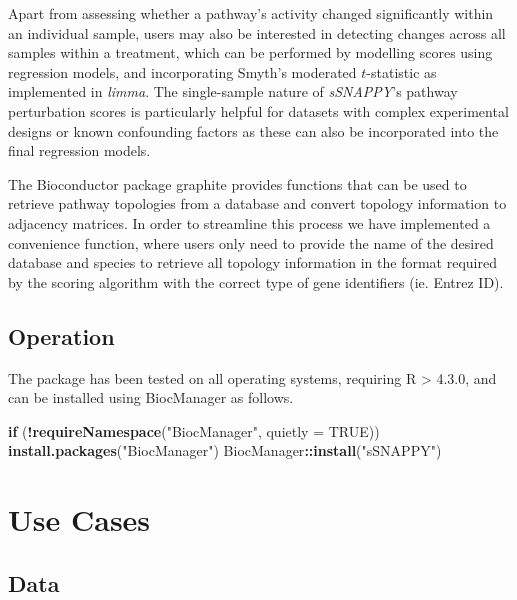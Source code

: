 \documentclass[9pt,a4paper,]{extarticle}
\newenvironment{Shaded}{\begin{snugshade}}{\end{snugshade}}
\newcommand{\AttributeTok}[1]{\textcolor[rgb]{0.13,0.29,0.53}{#1}}
\newcommand{\ConstantTok}[1]{\textcolor[rgb]{0.56,0.35,0.01}{#1}}
\newcommand{\ControlFlowTok}[1]{\textcolor[rgb]{0.13,0.29,0.53}{\textbf{#1}}}
\newcommand{\FunctionTok}[1]{\textcolor[rgb]{0.13,0.29,0.53}{\textbf{#1}}}
\newcommand{\NormalTok}[1]{#1}
\newcommand{\SpecialCharTok}[1]{\textcolor[rgb]{0.81,0.36,0.00}{\textbf{#1}}}
\newcommand{\StringTok}[1]{\textcolor[rgb]{0.31,0.60,0.02}{#1}}
\begin{document}
Apart from assessing whether a pathway's activity changed significantly within an individual sample, users may also be interested in detecting changes across all samples within a treatment, which can be performed by modelling scores using regression models, and incorporating Smyth's moderated \(t\)-statistic\citep{Smyth_2004} as implemented in \emph{limma}\citep{limma_2015}.
The single-sample nature of \emph{sSNAPPY}'s pathway perturbation scores is particularly helpful for datasets with complex experimental designs or known confounding factors as these can also be incorporated into the final regression models.

The Bioconductor package graphite\citep{Sales2012} provides functions that can be used to retrieve pathway topologies from a database and convert topology information to adjacency matrices.
In order to streamline this process we have implemented a convenience function, where users only need to provide the name of the desired database and species to retrieve all topology information in the format required by the scoring algorithm with the correct type of gene identifiers (ie. Entrez ID).

\hypertarget{operation}{%
\subsection{Operation}\label{operation}}

The package has been tested on all operating systems, requiring R \textgreater{} 4.3.0, and can be installed using BiocManager as follows.

\begin{Shaded}
\begin{Highlighting}[]
\ControlFlowTok{if}\NormalTok{ (}\SpecialCharTok{!}\FunctionTok{requireNamespace}\NormalTok{(}\StringTok{"BiocManager"}\NormalTok{, }\AttributeTok{quietly =} \ConstantTok{TRUE}\NormalTok{))}
  \FunctionTok{install.packages}\NormalTok{(}\StringTok{"BiocManager"}\NormalTok{)}
\NormalTok{BiocManager}\SpecialCharTok{::}\FunctionTok{install}\NormalTok{(}\StringTok{"sSNAPPY"}\NormalTok{)}
\end{Highlighting}
\end{Shaded}

\hypertarget{use-cases}{%
\section{Use Cases}\label{use-cases}}

\hypertarget{data}{%
\subsection{Data}\label{data}}
\end{document}
